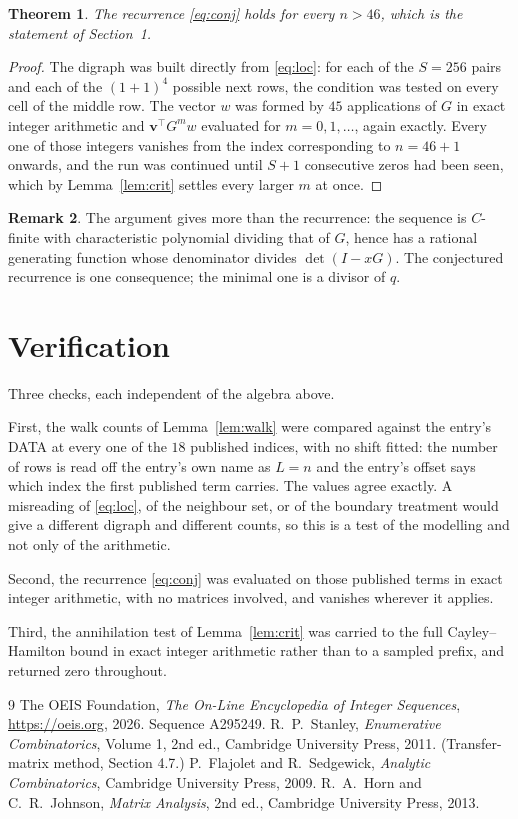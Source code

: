 \documentclass[11pt,a4paper]{article}
\theoremstyle{plain}
\newtheorem{theorem}{Theorem}
\theoremstyle{definition}
\newtheorem{remark}[theorem]{Remark}
\begin{document}
\begin{theorem}
The recurrence \eqref{eq:conj} holds for every $n>46$, which is the statement of
Section~1.
\end{theorem}

\begin{proof}
The digraph was built directly from \eqref{eq:loc}: for each of the $S=256$ pairs and each
of the $(1+1)^{4}$ possible next rows, the condition was tested on every cell of
the middle row. The vector $w$ was formed by $45$ applications of $G$ in exact integer
arithmetic and $\mathbf{v}^{\!\top}G^{m}w$ evaluated for $m=0,1,\dots$, again exactly.
Every one of those integers vanishes from the index corresponding to $n=46+1$ onwards,
and the run was continued until $S+1$ consecutive zeros had been seen, which by
Lemma~\ref{lem:crit} settles every larger $m$ at once.
\end{proof}

\begin{remark}
The argument gives more than the recurrence: the sequence is $C$-finite with characteristic
polynomial dividing that of $G$, hence has a rational generating function whose denominator
divides $\det(I-xG)$. The conjectured recurrence is one consequence; the minimal one is a
divisor of $q$.
\end{remark}

\section{Verification}

Three checks, each independent of the algebra above.

First, the walk counts of Lemma~\ref{lem:walk} were compared against the entry's DATA at
every one of the $18$ published indices, with no shift fitted: the number of rows is
read off the entry's own name as $L=n$ and the entry's offset says which index the first
published term carries. The values agree exactly. A misreading of \eqref{eq:loc}, of the
neighbour set, or of the boundary treatment would give a different digraph and different
counts, so this is a test of the modelling and not only of the arithmetic.

Second, the recurrence \eqref{eq:conj} was evaluated on those published terms in exact
integer arithmetic, with no matrices involved, and vanishes wherever it applies.

Third, the annihilation test of Lemma~\ref{lem:crit} was carried to the full
Cayley--Hamilton bound in exact integer arithmetic rather than to a sampled prefix, and
returned zero throughout.

\begin{thebibliography}{9}
 The OEIS Foundation, \emph{The On-Line Encyclopedia of Integer
Sequences}, \url{https://oeis.org}, 2026. Sequence A295249.
 R.~P.~Stanley, \emph{Enumerative Combinatorics}, Volume 1, 2nd ed.,
Cambridge University Press, 2011. (Transfer-matrix method, Section 4.7.)
 P.~Flajolet and R.~Sedgewick, \emph{Analytic Combinatorics}, Cambridge
University Press, 2009.
 R.~A.~Horn and C.~R.~Johnson, \emph{Matrix Analysis}, 2nd ed., Cambridge
University Press, 2013.
\end{thebibliography}
\end{document}
